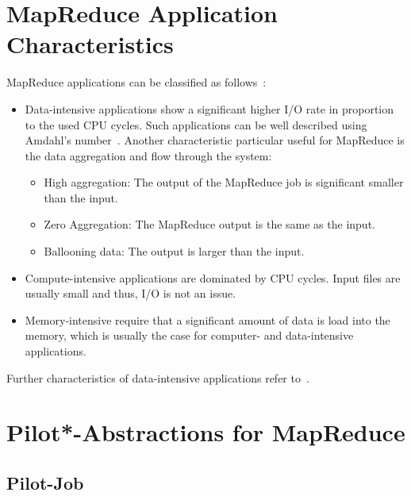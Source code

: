 \documentclass[conference,final]{IEEEtran}
\begin{document}
\section{MapReduce Application Characteristics}

MapReduce applications can be classified as follows~\cite{weissman2011,ramakrishnan2011}:
\begin{itemize}
    \item Data-intensive applications show a significant higher I/O rate in proportion to the used CPU cycles. Such applications can be well described using Amdahl's number~\cite{gray2000}. Another characteristic particular useful for MapReduce is the data aggregation and flow through the system:
        \begin{itemize}
            \item High aggregation: The output of the MapReduce job is significant smaller than the input.
            \item Zero Aggregation: The MapReduce output is the same as the 
            input.
            \item Ballooning data: The output is larger than the input.
        \end{itemize}
    \item Compute-intensive applications are dominated by CPU cycles. Input 
    files are usually small and thus, I/O is not an issue.
    \item Memory-intensive require that a significant amount of data is load
    into the memory, which is usually the case for computer- and data-intensive 
    applications.
\end{itemize}
Further characteristics of data-intensive applications refer to~\cite{jha2011}.



\section{Pilot*-Abstractions for MapReduce}

\subsection{Pilot-Job}
\end{document}
